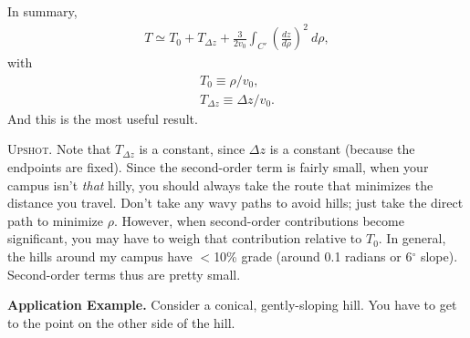 \documentclass[12pt]{article}
\begin{document}
In summary,
\begin{align} \label{eq:6-final}
\boxed{T \simeq T_{0}+T_{\Delta z}+\frac{3}{2 v_{0}}\int_{C'}\left(\frac{dz}{d\rho}\right)^2\: d\rho},
\end{align} with
\begin{gather*} 
	T_{0}\equiv \rho / v_{0}, \\[0.5em]
	T_{\Delta z} \equiv \Delta z / v_{0}.
\end{gather*}
And this is the most useful result.

\vspace{10pt} \textsc{Upshot.} Note that $T_{\Delta z}$ is a constant, since $\Delta z$ is a constant (because the endpoints are fixed). Since the second-order term is fairly small, when your campus isn't \textit{that} hilly, you should always take the route that minimizes the distance you travel. Don't take any wavy paths to avoid hills; just take the direct path to minimize $\rho$. However, when second-order contributions become significant, you may have to weigh that contribution relative to $T_{0}$. In general, the hills around my campus have $<$10\% grade (around 0.1 radians or 6$^\circ$ slope). Second-order terms thus are pretty small.

\vspace{10pt} \textbf{Application Example.} Consider a conical, gently-sloping hill. You have to get to the point on the other side of the hill. 
\end{document}
